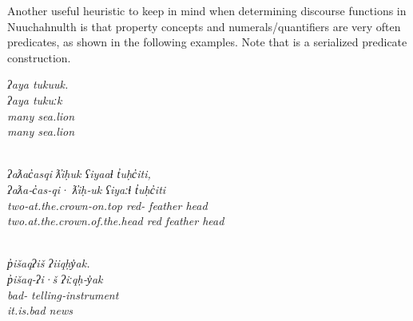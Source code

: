 Another useful heuristic to keep in mind when determining discourse functions in Nuuchahnulth is that property concepts and numerals/quantifiers are very often predicates, as shown in the following examples. Note that  is a serialized predicate construction.

\begin{exe}
  \ex\label{ex:3.15}
  \begin{xlist}

    \ex\label{ex:3.15a}
    \glllll \em{ʔaya}      tukuuk.\\
            \em{ʔaya}      tukuːk\\
            \em{many}      sea.lion\\
            \em{many}      sea.lion\\
            \em{} \\

    \ex\label{ex:3.15b}
    \glllll \em{ʔaƛac̓asqi}                    \em{ƛ̓iḥuk}       ʕiyaaɬ   t̓uḥc̓iti,\\
            \em{ʔaƛa‑c̓as‑qi·}                  \em{ƛ̓iḥ‑uk}      ʕiyaːɬ   t̓uḥc̓iti\\
            \em{two‑at.the.crown‑on.top}       \em{red‑} feather  head\\
            \em{two.at.the.crown.of.the.head} \em{red}          feather  head\\
            \em{}                    \em{}     \\

    \ex\label{ex:3.15c}
    \glllll \em{p̓išaqʔiš}       ʔiiqḥy̓ak.\\
            \em{p̓išaq‑ʔi·š}     ʔiːqḥ‑y̓ak\\
            \em{bad‑} telling‑instrument\\
            \em{it.is.bad}      news\\
                       \\

  \end{xlist}
\end{exe}

